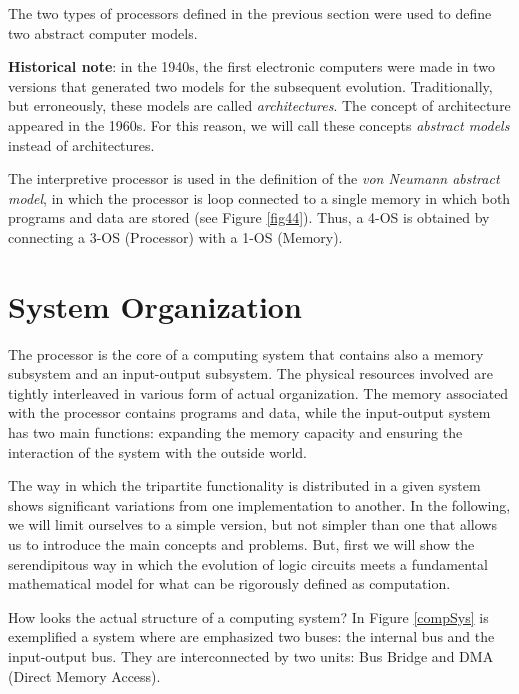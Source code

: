 The two types of processors defined in the previous section were used to define two abstract computer models.

\smallskip

{\bf Historical note}: in the 1940s, the first electronic computers were made in two versions that generated two models for the subsequent evolution. Traditionally, but erroneously, these models are called {\em architectures}. The concept of architecture appeared in the 1960s. For this reason, we will call these concepts {\em abstract models} instead of architectures.

\smallskip



The interpretive processor is used in the definition of the {\em von Neumann abstract model}, in which the processor is loop connected to a single memory in which both programs and data are stored (see Figure \ref{fig44}). Thus, a 4-OS is obtained by connecting a 3-OS (Processor) with a 1-OS (Memory).


\section{System Organization}

The processor is the core of a computing system that contains also a memory subsystem and an input-output subsystem. The physical resources involved are tightly interleaved in various form of actual organization. The memory associated with the processor contains programs and data, while the input-output system has two main functions: expanding the memory capacity and ensuring the interaction of the system with the outside world.


The way in which the tripartite functionality is distributed in a given system shows significant variations from one implementation to another. In the following, we will limit ourselves to a simple version, but not simpler than one that allows us to introduce the main concepts and problems. But, first we will show the serendipitous way in which the evolution of logic circuits meets a fundamental mathematical model for what can be rigorously defined as computation.

How looks the actual structure of a computing system? In Figure \ref{compSys} is exemplified a system where are emphasized two buses: the internal bus and the input-output bus. They are interconnected by two units: Bus Bridge and DMA (Direct Memory Access).

